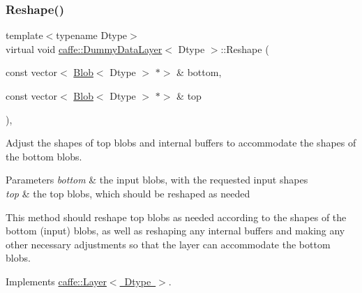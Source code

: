 \subsubsection{\texorpdfstring{Reshape()}{Reshape()}\hspace{0.1cm}{\footnotesize\ttfamily [1/2]}}
{\footnotesize\ttfamily template$<$typename Dtype$>$ \\
virtual void \mbox{\hyperlink{classcaffe_1_1_dummy_data_layer}{caffe\+::\+Dummy\+Data\+Layer}}$<$ Dtype $>$\+::Reshape (\begin{DoxyParamCaption}\item[{const vector$<$ \mbox{\hyperlink{classcaffe_1_1_blob}{Blob}}$<$ Dtype $>$ $\ast$$>$ \&}]{bottom,  }\item[{const vector$<$ \mbox{\hyperlink{classcaffe_1_1_blob}{Blob}}$<$ Dtype $>$ $\ast$$>$ \&}]{top }\end{DoxyParamCaption})\hspace{0.3cm}{\ttfamily [inline]}, {\ttfamily [virtual]}}



Adjust the shapes of top blobs and internal buffers to accommodate the shapes of the bottom blobs. 


\begin{DoxyParams}{Parameters}
{\em bottom} & the input blobs, with the requested input shapes \\
\hline
{\em top} & the top blobs, which should be reshaped as needed\\
\hline
\end{DoxyParams}
This method should reshape top blobs as needed according to the shapes of the bottom (input) blobs, as well as reshaping any internal buffers and making any other necessary adjustments so that the layer can accommodate the bottom blobs. 

Implements \mbox{\hyperlink{classcaffe_1_1_layer_a7fe981e8af8d93d587acf2a952be563d}{caffe\+::\+Layer$<$ Dtype $>$}}.

\mbox{\label{classcaffe_1_1_dummy_data_layer_ae72f2ea80339981bf925f0291f62d527}} 

